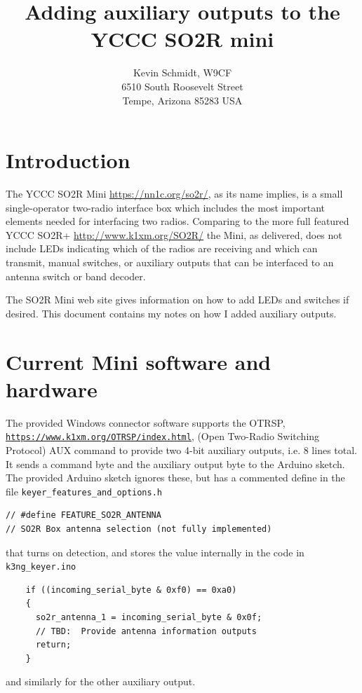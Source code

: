 \documentclass[12pt]{article}
\begin{document}
\title{
Adding auxiliary outputs to the YCCC SO2R mini
}
\author{
Kevin Schmidt, W9CF\\
6510 South Roosevelt Street\\
Tempe, Arizona 85283 USA\\
}
\date{}
\maketitle

\section{Introduction}
The YCCC SO2R Mini
\href{https://nn1c.org/so2r/}{https://nn1c.org/so2r/},
as its name implies, is
a small single-operator two-radio interface box which includes the
most important elements needed for interfacing two radios.
Comparing to the more full featured YCCC SO2R+
\href{http://www.k1xm.org/SO2R/}{http://www.k1xm.org/SO2R/}
the Mini, as delivered, does not include LEDs indicating which of the radios
are receiving and which can transmit, manual switches, or auxiliary outputs
that can be interfaced to an antenna switch or band decoder.

The SO2R Mini web site gives information on how to add LEDs and switches
if desired. This document contains my notes on how I added auxiliary
outputs.

\section{Current Mini software and hardware}
The provided Windows connector software supports the OTRSP,
\href{https://www.k1xm.org/OTRSP/index.html}
{\nolinkurl{https://www.k1xm.org/OTRSP/index.html}},
(Open Two-Radio Switching Protocol)
AUX command to provide two 4-bit auxiliary outputs, i.e. 8 lines total.
It sends a command byte and the auxiliary output byte to the Arduino sketch.
The provided Arduino sketch ignores these, but has a commented define
in the file \verb|keyer_features_and_options.h|
\begin{verbatim}
// #define FEATURE_SO2R_ANTENNA
// SO2R Box antenna selection (not fully implemented)
\end{verbatim}
that turns on detection, and stores the value internally in the code
in \verb|k3ng_keyer.ino|
\begin{verbatim}
    if ((incoming_serial_byte & 0xf0) == 0xa0)
    {
      so2r_antenna_1 = incoming_serial_byte & 0x0f;
      // TBD:  Provide antenna information outputs
      return;
    }
\end{verbatim}
and similarly for the other auxiliary output.
\end{document}
